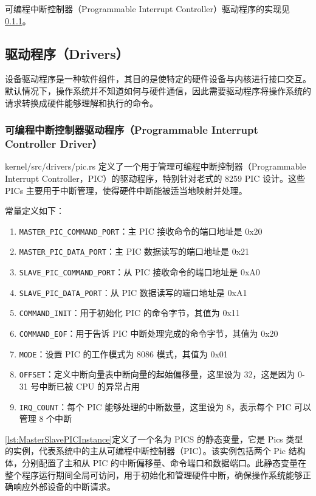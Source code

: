 可编程中断控制器（Programmable Interrupt Controller）驱动程序的实现见\cref{sec:ProgrammableInterruptControllerDriver}。

\subsection{驱动程序（Drivers）}

设备驱动程序是一种软件组件，其目的是使特定的硬件设备与内核进行接口交互。默认情况下，操作系统并不知道如何与硬件通信，因此需要驱动程序将操作系统的请求转换成硬件能够理解和执行的命令。

\subsubsection{可编程中断控制器驱动程序（Programmable Interrupt Controller Driver）}\label{sec:ProgrammableInterruptControllerDriver}

kernel/src/drivers/pic.rs 定义了一个用于管理可编程中断控制器（Programmable Interrupt Controller，PIC）的驱动程序，特别针对老式的 8259 PIC 设计。这些 PICs 主要用于中断管理，使得硬件中断能被适当地映射并处理。

常量定义如下：

\begin{enumerate}
    \item \texttt{MASTER\_PIC\_COMMAND\_PORT}：主 PIC 接收命令的端口地址是 0x20
    \item \texttt{MASTER\_PIC\_DATA\_PORT}：主 PIC 数据读写的端口地址是 0x21
    \item \texttt{SLAVE\_PIC\_COMMAND\_PORT}：从 PIC 接收命令的端口地址是 0xA0
    \item \texttt{SLAVE\_PIC\_DATA\_PORT}：从 PIC 数据读写的端口地址是 0xA1
    \item \texttt{COMMAND\_INIT}：用于初始化 PIC 的命令字节，其值为 0x11
    \item \texttt{COMMAND\_EOF}：用于告诉 PIC 中断处理完成的命令字节，其值为 0x20
    \item \texttt{MODE}：设置 PIC 的工作模式为 8086 模式，其值为 0x01
    \item \texttt{OFFSET}：定义中断向量表中断向量的起始偏移量，这里设为 32，这是因为 0-31 号中断已被 CPU 的异常占用
    \item \texttt{IRQ\_COUNT}：每个 PIC 能够处理的中断数量，这里设为 8，表示每个 PIC 可以管理 8 个中断
\end{enumerate}

\cref{lst:MasterSlavePICInstance}定义了一个名为 PICS 的静态变量，它是 Pics 类型的实例，代表系统中的主从可编程中断控制器（PIC）。该实例包括两个 Pic 结构体，分别配置了主和从 PIC 的中断偏移量、命令端口和数据端口。此静态变量在整个程序运行期间全局可访问，用于初始化和管理硬件中断，确保操作系统能够正确响应外部设备的中断请求。

